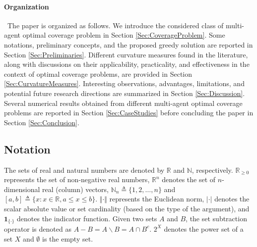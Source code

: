 \documentclass[letterpaper, 10 pt, conference]{ieeeconf}
\newcommand{\R}{\mathbb{R}}
\newcommand{\N}{\mathbb{N}}
\begin{document}

\paragraph*{Organization}\ 
The paper is organized as follows. We introduce the considered class of multi-agent optimal coverage problem in Section \ref{Sec:CoverageProblem}. Some notations, preliminary concepts, and the proposed greedy solution are reported in Section \ref{Sec:Preliminaries}. Different curvature measures found in the literature, along with discussions on their applicability, practicality, and effectiveness in the context of optimal coverage problems, are provided in Section \ref{Sec:CurvatureMeasures}. 
Interesting observations, advantages, limitations, and potential future research directions are summarized in Section \ref{Sec:Discussion}. 
Several numerical results obtained from different multi-agent optimal coverage problems \cite{Welikala2019J1} are reported in Section \ref{Sec:CaseStudies} before concluding the paper in Section \ref{Sec:Conclusion}. 

\subsection{Notation}
The sets of real and natural numbers are denoted by $\R$ and $\N$, respectively. $\R_{\geq 0}$ represents the set of non-negative real numbers, $\R^n$ denotes the set of $n$-dimensional real (column) vectors, $\mathbb{N}_n \triangleq \{1,2,\ldots,n\}$ and $[a,b]\triangleq \{x: x\in\R, a\leq x \leq b\}$. $\Vert \cdot \Vert$ represents the Euclidean norm, $\vert \cdot \vert$ denotes the scalar absolute value or set cardinality (based on the type of the argument), and $\mathbf{1}_{\{\cdot\}}$ denotes the indicator function. Given two sets $A$ and $B$, the set subtraction operator is denoted as $A-B = A \backslash B = A\cap B^c$. $2^X$ denotes the power set of a set $X$ and $\emptyset$ is the empty set. 
\end{document}
